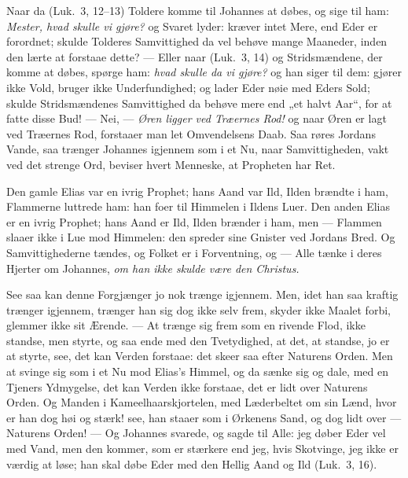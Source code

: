 \documentclass[12pt,a4paper]{book}
\begin{document}
Naar da (Luk.\ 3, 12--13) Toldere komme til Johannes at døbes, og sige til ham:
\emph{Mester, hvad skulle vi gjøre?} og Svaret lyder: {\large kræver intet Mere,
end Eder er forordnet;} skulde Tolderes Samvittighed da vel behøve mange
Maaneder, inden den lærte at forstaae dette? --- Eller naar (Luk.\ 3, 14) og
Stridsmændene, der komme at døbes, spørge ham: \emph{hvad skulle da vi gjøre?} og
han siger til dem: {\large gjører ikke Vold, bruger ikke Underfundighed; og lader
Eder nøie med Eders Sold;} skulde Stridsmændenes Samvittighed da behøve mere end
„et halvt Aar“, for at fatte disse Bud! --- Nei, --- \emph{Øren ligger ved
Træernes Rod!} og naar Øren er lagt ved Træernes Rod, forstaaer man let
Omvendelsens Daab. Saa røres Jordans Vande, saa trænger Johannes igjennem som i
et Nu, naar Samvittigheden, vakt ved det strenge Ord, beviser hvert Menneske, at
Propheten har Ret.

Den gamle Elias var en ivrig Prophet; hans Aand var Ild, Ilden brændte i ham,
Flammerne luttrede ham: han foer til Himmelen i Ildens Luer. Den anden Elias er
en ivrig Prophet; hans Aand er Ild, Ilden brænder i ham, men --- Flammen slaaer
ikke i Lue mod Himmelen: den spreder sine Gnister ved Jordans Bred. Og
Samvittighederne tændes, og Folket er i Forventning, og --- Alle tænke i deres
Hjerter om Johannes, \emph{om han ikke skulde være den Christus.}

See saa kan denne Forgjænger jo nok trænge igjennem. Men, idet han saa kraftig
trænger igjennem, trænger han sig dog
ikke selv frem, skyder ikke Maalet forbi, glemmer ikke sit Ærende. --- At trænge
sig frem som en rivende Flod, ikke standse, men styrte, og saa ende med den
Tvetydighed, at det, at standse, jo er at styrte, see, det kan Verden forstaae:
det skeer saa efter Naturens Orden. Men at svinge sig som i et Nu mod Elias's
Himmel, og da sænke sig og dale, med en Tjeners Ydmygelse, det kan Verden ikke
forstaae, det er lidt over Naturens Orden. Og Manden i Kameelhaarskjortelen,
med Læderbeltet om sin Lænd, hvor er han dog høi og stærk! see, han staaer som i
Ørkenens Sand, og dog lidt over --- Naturens Orden! --- Og Johannes svarede, og
sagde til Alle: {\large jeg døber Eder vel med Vand, men den kommer, som er
stærkere end jeg, hvis Skotvinge, jeg ikke er værdig at løse; han skal døbe Eder
med den Hellig Aand og Ild (Luk.\ 3, 16).}
\end{document}
